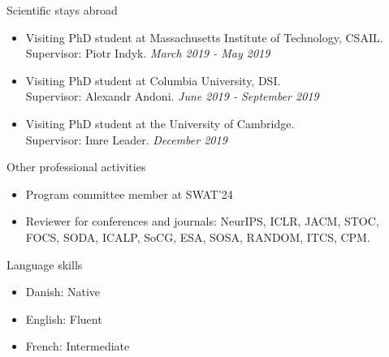 \documentclass{resume} %
\begin{document}

\begin{rSection}{Scientific stays abroad}
\begin{itemize}
\item Visiting PhD student at Massachusetts Institute of Technology, CSAIL. \\Supervisor: Piotr Indyk. \hfill{\emph{March 2019 - May 2019}}
\item Visiting PhD student at Columbia University, DSI. \\ Supervisor: Alexandr Andoni. \hfill{\emph{June 2019 - September 2019}}
\item Visiting PhD student at the University of Cambridge.  \\Supervisor: Imre Leader. \hfill{\emph{December 2019}}
\end{itemize}

\end{rSection}


\begin{rSection}{Other professional activities}
\begin{itemize}
\item Program committee member at SWAT'24
\item Reviewer for conferences and journals: NeurIPS, ICLR, JACM, STOC, FOCS, SODA, ICALP, SoCG, ESA, SOSA, RANDOM, ITCS, CPM.
\end{itemize}

\end{rSection}


\begin{rSection}{Language skills}
\begin{itemize}
\item Danish: Native
\item English: Fluent
\item French: Intermediate
\end{itemize}
\end{rSection}




\end{document}
